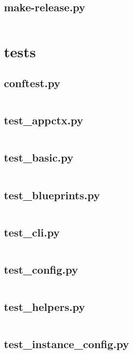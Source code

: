\documentclass{article}
\begin{document}
\subsection{make-release.py}
\inputminted{python}{/tmp/flask/scripts/make-release.py}
\newpage

\section{tests}

\subsection{conftest.py}
\inputminted{python}{/tmp/flask/tests/conftest.py}
\newpage

\subsection{test\_appctx.py}
\inputminted{python}{/tmp/flask/tests/test_appctx.py}
\newpage

\subsection{test\_basic.py}
\inputminted{python}{/tmp/flask/tests/test_basic.py}
\newpage

\subsection{test\_blueprints.py}
\inputminted{python}{/tmp/flask/tests/test_blueprints.py}
\newpage

\subsection{test\_cli.py}
\inputminted{python}{/tmp/flask/tests/test_cli.py}
\newpage

\subsection{test\_config.py}
\inputminted{python}{/tmp/flask/tests/test_config.py}
\newpage

\subsection{test\_helpers.py}
\inputminted{python}{/tmp/flask/tests/test_helpers.py}
\newpage

\subsection{test\_instance\_config.py}
\inputminted{python}{/tmp/flask/tests/test_instance_config.py}
\newpage
\end{document}

